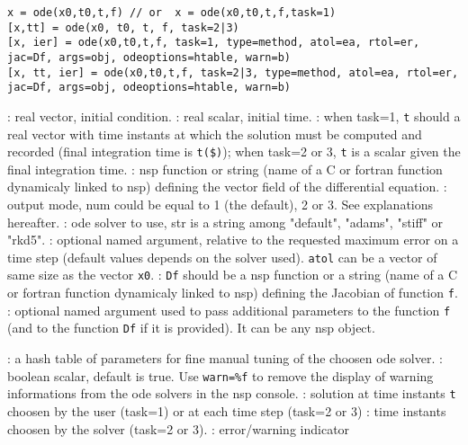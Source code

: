 
\begin{mandesc}
\end{mandesc}

\begin{calling_sequence}
\begin{verbatim}
x = ode(x0,t0,t,f) // or  x = ode(x0,t0,t,f,task=1)
[x,tt] = ode(x0, t0, t, f, task=2|3)
[x, ier] = ode(x0,t0,t,f, task=1, type=method, atol=ea, rtol=er, jac=Df, args=obj, odeoptions=htable, warn=b)
[x, tt, ier] = ode(x0,t0,t,f, task=2|3, type=method, atol=ea, rtol=er, jac=Df, args=obj, odeoptions=htable, warn=b)
\end{verbatim}
\end{calling_sequence}
\begin{parameters}
  \begin{varlist}
    : real vector, initial condition.
    : real scalar, initial time.
    : when task=1, \verb+t+ should a real vector with time instants at which the solution must
    be computed and recorded (final integration time is \verb+t($)+); when task=2 or 3, \verb+t+ is a 
    scalar given the final integration time.
    : nsp function or string (name of a C or fortran function dynamicaly linked to nsp) 
               defining the vector field of the differential equation.
    : output mode, num could be equal to 1 (the default), 2 or 3. See explanations hereafter.
    : ode solver to use, str is a string among  "default", "adams", "stiff" or "rkd5".
    : optional named argument, relative to the requested maximum error on a time step 
    (default values depends on the solver used). \verb+atol+ can be a vector of same size as 
    the vector \verb+x0+.
    : \verb+Df+ should be a nsp function or a string (name of a C or fortran function dynamicaly linked 
                    to nsp) defining the Jacobian of function \verb+f+.
    : optional named argument used to pass additional parameters to the function \verb+f+ 
    (and to the function \verb+Df+ if it is provided). It can be any nsp object.

    : a hash table of parameters for fine manual tuning of the choosen ode solver.
    : boolean scalar, default is true. Use \verb+warn=%f+ to remove the display of warning 
                    informations from the ode solvers in the nsp console.
    : solution at time instants \verb+t+ choosen by the user (task=1) or at each time step (task=2 or 3)
    : time instants choosen by the solver (task=2 or 3).
    : error/warning indicator 
  \end{varlist}
\end{parameters}


